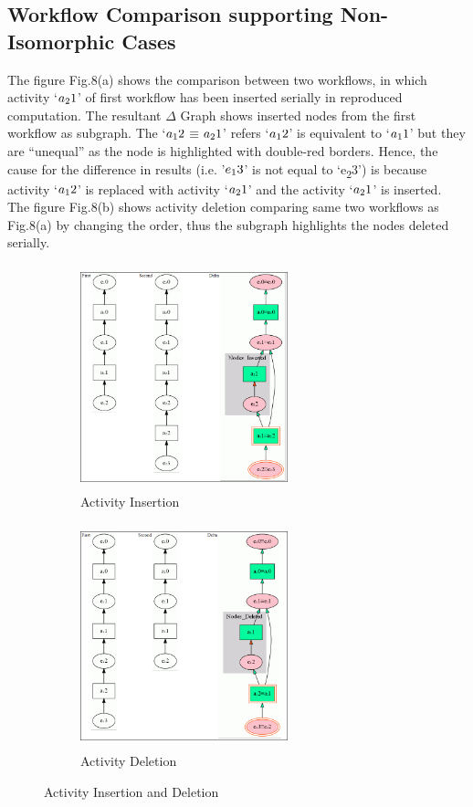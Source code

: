 \documentclass[10pt,conference,twocolumn]{IEEEtran}
\begin{document}
\subsection{Workflow Comparison supporting Non-Isomorphic Cases}
The figure Fig.8(a) shows the comparison between two workflows, in which activity `$a\textsubscript{2}1$' of first workflow has been inserted serially in reproduced computation. The resultant $\Delta$ Graph shows inserted nodes from the first workflow as subgraph. The `$a\textsubscript{1}2$$\equiv$$a\textsubscript{2}1$' refers `$a\textsubscript{1}2$' is equivalent to `$a\textsubscript{1}1$' but they are \enquote{unequal} as the node is highlighted with double-red borders. Hence, the cause for the difference in results (i.e. '$e\textsubscript{1}3$' is not equal to  `e\textsubscript{2}3') is because activity `$a\textsubscript{1}2$'  is replaced with activity `$a\textsubscript{2}1$' and the activity `$a\textsubscript{2}1$' is inserted. The figure Fig.8(b) shows activity deletion comparing same two workflows as Fig.8(a) by changing the order, thus the subgraph highlights the nodes deleted serially.
\begin{figure}
\centering
\begin{subfigure}{.50\textwidth}
  \centering
  \includegraphics[width=6cm,height=6.5cm]{DeltaActivityInsertion.png}
  \caption{Activity Insertion}
  \label{fig:Activity Insertion}
\end{subfigure}%
\begin{subfigure}{.50\textwidth}
    \centering
  \includegraphics[width=6cm,height=6.5cm]{DeltaActivityDeletion.png}
  \caption{Activity Deletion}
  \label{fig:Activity Deletion}
\end{subfigure}
\label{fig:test}
\caption{Activity Insertion and Deletion}
\end{figure}
\end{document}
